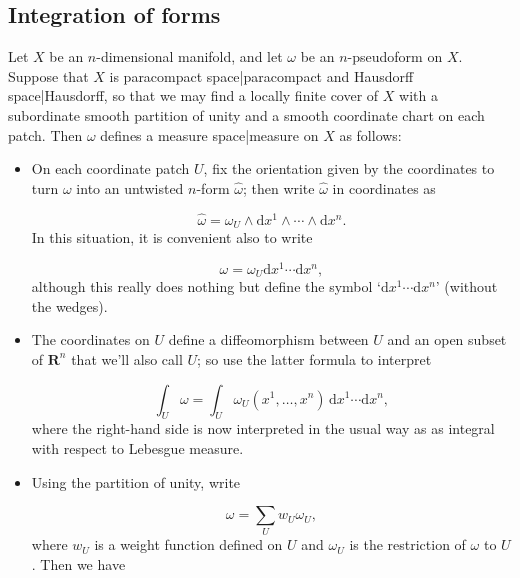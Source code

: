 \documentclass[preprint, 5p, 10pt]{elsarticle}
\theoremstyle{plain}
\begin{document}
\hypertarget{integration_of_forms_8}{}\subsection*{{Integration of forms}}\label{integration_of_forms_8}

Let $X$ be an $n$-dimensional manifold, and let $\omega$ be an $n$-pseudoform on $X$. Suppose that $X$ is paracompact space|paracompact and Hausdorff space|Hausdorff, so that we may find a locally finite cover of $X$ with a subordinate smooth partition of unity and a smooth coordinate chart on each patch. Then $\omega$ defines a measure space|measure on $X$ as follows:

\begin{itemize}%
\item On each coordinate patch $U$, fix the orientation given by the coordinates to turn $\omega$ into an untwisted $n$-form $\hat{\omega}$; then write $\hat{\omega}$ in coordinates as

\begin{displaymath}
\hat{\omega} = \omega_U \wedge \mathrm{d}x^1 \wedge \cdots \wedge \mathrm{d}x^n .
\end{displaymath}
In this situation, it is convenient also to write

\begin{displaymath}
\omega = \omega_U \mathrm{d}x^1 \cdots \mathrm{d}x^n ,
\end{displaymath}
although this really does nothing but define the symbol ‘$\mathrm{d}x^1 \cdots \mathrm{d}x^n$’ (without the wedges).


\item The coordinates on $U$ define a diffeomorphism between $U$ and an open subset of $\mathbf{R}^n$ that we'{}ll also call $U$; so use the latter formula to interpret

\begin{equation}
\int_U \omega = \int_U \omega_U(x^1,\ldots,x^n)\, \mathrm{d}x^1 \cdots \mathrm{d}x^n ,
\label{absvalposs}\end{equation}
where the right-hand side is now interpreted in the usual way as as integral with respect to Lebesgue measure.


\item Using the partition of unity, write

\begin{displaymath}
\omega = \sum_U w_U \omega_U ,
\end{displaymath}
where $w_U$ is a weight function defined on $U$ and $\omega_U$ is the restriction of $\omega$ to $U$. Then we have


\end{itemize}
\end{document}
